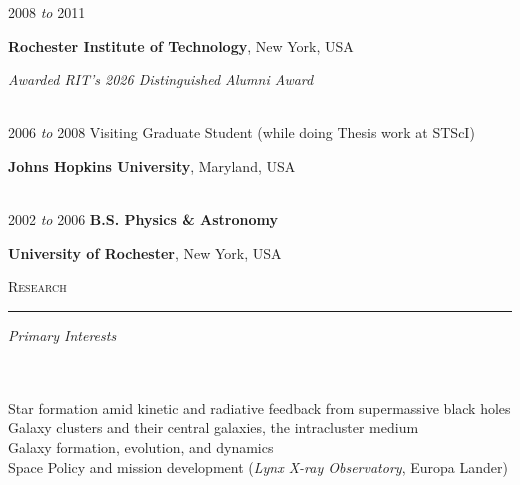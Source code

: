 \documentclass[11pt]{article}
\makeatletter
\def\vhrulefill#1{\leavevmode\leaders\hrule\@height#1\hfill \kern\z@}
\makeatother
\begin{document}
\hspace{2.5mm}2008 \textit{to} 2011 

\hspace{42mm}\parbox{5.15in}{\textbf{Rochester Institute of Technology}, New York, USA}

\hspace{42mm} \parbox{5.15in}{\textit{Awarded RIT's 2026 Distinguished Alumni Award}} \\




\hspace{2.5mm}2006 \textit{to} 2008  \hspace{18mm} Visiting Graduate Student (while doing Thesis work at STScI)

\hspace{42mm} \parbox{5.15in}{\textbf{Johns Hopkins University}, Maryland, USA} \\



\hspace{2.5mm} 2002 \textit{to} 2006 \hspace{17mm} {\textbf{B.S. Physics \& Astronomy}}

\hspace{42mm} \parbox{5.15in}{\textbf{University of Rochester}, New York, USA}



\textsc{Research}  \vhrulefill{0.4pt}

\vspace{2mm}

\hspace{2.5mm} \parbox{1.5in}{\textit{Primary Interests \\\\\\}} \parbox{5.15in}{Star formation amid kinetic and radiative feedback from supermassive black holes \\ Galaxy clusters and their central galaxies, the intracluster medium \\ Galaxy formation, evolution, and dynamics \\ Space Policy and mission development (\textit{Lynx X-ray Observatory}, Europa Lander)} \\
\end{document}
